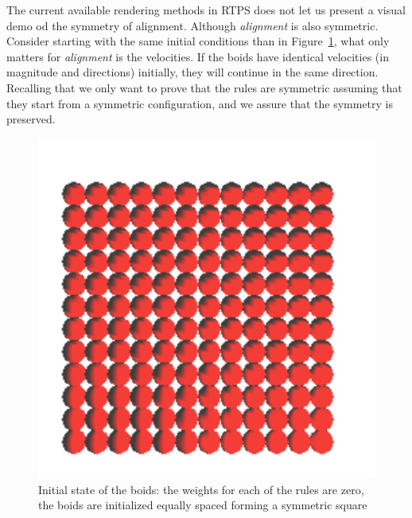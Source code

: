 The current available rendering methods in RTPS does not let us present a visual demo od the symmetry of alignment. Although \textit{alignment} is also symmetric. Consider starting with the same initial conditions than in Figure~\ref{alignRule}, what only matters for \textit{alignment} is the velocities. If the boids have identical velocities (in magnitude and directions) initially, they will continue in the same direction. Recalling that we only want to prove that the rules are symmetric assuming that they start from a symmetric configuration, and we assure that the symmetry is preserved.

\begin{figure}[htbp]
\begin{center}
\includegraphics[scale=0.5]{figures/align.pdf}
\caption{Initial state of the boids: the weights for each of the rules are zero, the boids are initialized equally spaced forming a symmetric square}
\label{alignRule}
\end{center}
\end{figure}

